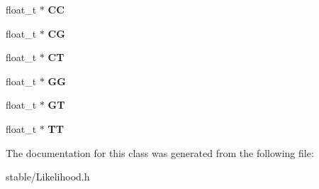 \begin{DoxyCompactItemize}
\item 
\hypertarget{classgenotype_aee1aca16001a6648a0aa83b46cf8e325}{float\-\_\-t $\ast$ {\bfseries C\-C}}\label{classgenotype_aee1aca16001a6648a0aa83b46cf8e325}

\item 
\hypertarget{classgenotype_aae6c273da4738411ed1c4b710e7bc2a0}{float\-\_\-t $\ast$ {\bfseries C\-G}}\label{classgenotype_aae6c273da4738411ed1c4b710e7bc2a0}

\item 
\hypertarget{classgenotype_ae8d547dd7f087199991c21382306b60d}{float\-\_\-t $\ast$ {\bfseries C\-T}}\label{classgenotype_ae8d547dd7f087199991c21382306b60d}

\item 
\hypertarget{classgenotype_a91ef7aeb4a0db8805d93537b425045c2}{float\-\_\-t $\ast$ {\bfseries G\-G}}\label{classgenotype_a91ef7aeb4a0db8805d93537b425045c2}

\item 
\hypertarget{classgenotype_a915d26cd1e3fd2b7ebcec466ee2199eb}{float\-\_\-t $\ast$ {\bfseries G\-T}}\label{classgenotype_a915d26cd1e3fd2b7ebcec466ee2199eb}

\item 
\hypertarget{classgenotype_a2481f0a0ace1f188ccf3e412ee7e5dd0}{float\-\_\-t $\ast$ {\bfseries T\-T}}\label{classgenotype_a2481f0a0ace1f188ccf3e412ee7e5dd0}

\end{DoxyCompactItemize}


The documentation for this class was generated from the following file\-:\begin{DoxyCompactItemize}
\item 
stable/Likelihood.\-h\end{DoxyCompactItemize}
